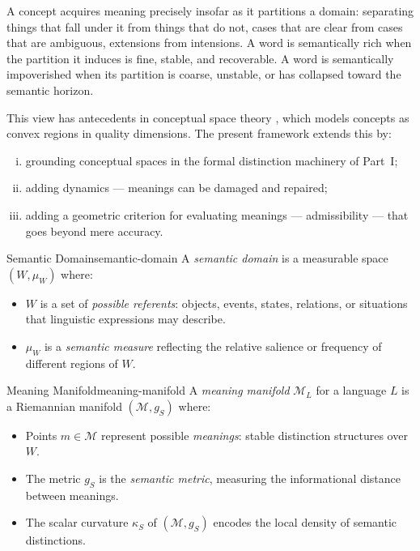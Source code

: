 \documentclass[12pt,twoside,openright]{book}
\begin{document}
A concept acquires meaning precisely insofar as it
partitions a domain: separating things that fall under
it from things that do not, cases that are clear from
cases that are ambiguous, extensions from intensions.
A word is semantically rich when the partition it
induces is fine, stable, and recoverable.
A word is semantically impoverished when its partition
is coarse, unstable, or has collapsed toward the
semantic horizon.

This view has antecedents in conceptual space theory
\parencite{gardenfors2000conceptual}, which models
concepts as convex regions in quality dimensions.
The present framework extends this by:
\begin{enumerate}[(i)]
  \item grounding conceptual spaces in the formal
        distinction machinery of Part~I;
  \item adding dynamics — meanings can be damaged and
        repaired;
  \item adding a geometric criterion for evaluating
        meanings — admissibility — that goes beyond
        mere accuracy.
\end{enumerate}

\begin{definition}{Semantic Domain}{semantic-domain}
  A \emph{semantic domain} is a measurable space
  $(W, \mu_W)$ where:
  \begin{itemize}[nosep]
    \item $W$ is a set of \emph{possible referents}:
          objects, events, states, relations, or
          situations that linguistic expressions
          may describe.
    \item $\mu_W$ is a \emph{semantic measure}
          reflecting the relative salience or
          frequency of different regions of $W$.
  \end{itemize}
\end{definition}

\begin{definition}{Meaning Manifold}{meaning-manifold}
  A \emph{meaning manifold} $\mathcal{M}_L$ for a
  language $L$ is a Riemannian manifold
  $(\mathcal{M}, g_S)$ where:
  \begin{itemize}[nosep]
    \item Points $m \in \mathcal{M}$ represent possible
          \emph{meanings}: stable distinction structures
          over $W$.
    \item The metric $g_S$ is the \emph{semantic metric},
          measuring the informational distance between
          meanings.
    \item The scalar curvature $\kappa_S$ of
          $(\mathcal{M}, g_S)$ encodes the local
          density of semantic distinctions.
  \end{itemize}
\end{definition}
\end{document}
